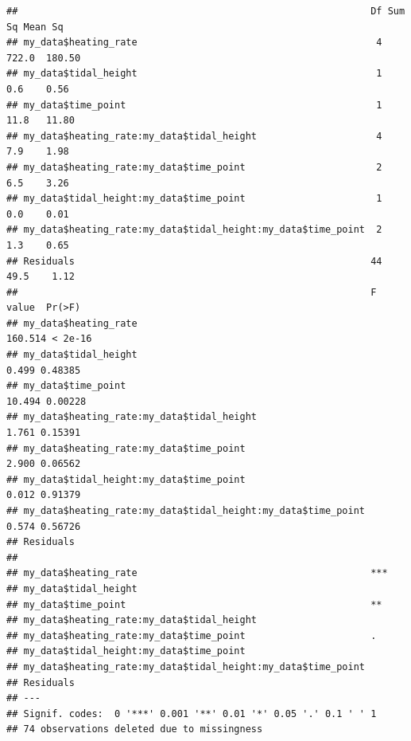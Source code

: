 \documentclass[
]{article}
\newenvironment{Shaded}{\begin{snugshade}}{\end{snugshade}}
\newcommand{\AttributeTok}[1]{\textcolor[rgb]{0.77,0.63,0.00}{#1}}
\newcommand{\FunctionTok}[1]{\textcolor[rgb]{0.00,0.00,0.00}{#1}}
\newcommand{\NormalTok}[1]{#1}
\newcommand{\OtherTok}[1]{\textcolor[rgb]{0.56,0.35,0.01}{#1}}
\newcommand{\SpecialCharTok}[1]{\textcolor[rgb]{0.00,0.00,0.00}{#1}}
\begin{document}
\begin{verbatim}
##                                                              Df Sum Sq Mean Sq
## my_data$heating_rate                                          4  722.0  180.50
## my_data$tidal_height                                          1    0.6    0.56
## my_data$time_point                                            1   11.8   11.80
## my_data$heating_rate:my_data$tidal_height                     4    7.9    1.98
## my_data$heating_rate:my_data$time_point                       2    6.5    3.26
## my_data$tidal_height:my_data$time_point                       1    0.0    0.01
## my_data$heating_rate:my_data$tidal_height:my_data$time_point  2    1.3    0.65
## Residuals                                                    44   49.5    1.12
##                                                              F value  Pr(>F)
## my_data$heating_rate                                         160.514 < 2e-16
## my_data$tidal_height                                           0.499 0.48385
## my_data$time_point                                            10.494 0.00228
## my_data$heating_rate:my_data$tidal_height                      1.761 0.15391
## my_data$heating_rate:my_data$time_point                        2.900 0.06562
## my_data$tidal_height:my_data$time_point                        0.012 0.91379
## my_data$heating_rate:my_data$tidal_height:my_data$time_point   0.574 0.56726
## Residuals                                                                   
##                                                                 
## my_data$heating_rate                                         ***
## my_data$tidal_height                                            
## my_data$time_point                                           ** 
## my_data$heating_rate:my_data$tidal_height                       
## my_data$heating_rate:my_data$time_point                      .  
## my_data$tidal_height:my_data$time_point                         
## my_data$heating_rate:my_data$tidal_height:my_data$time_point    
## Residuals                                                       
## ---
## Signif. codes:  0 '***' 0.001 '**' 0.01 '*' 0.05 '.' 0.1 ' ' 1
## 74 observations deleted due to missingness
\end{verbatim}

\begin{Shaded}
\end{Shaded}
\end{document}
